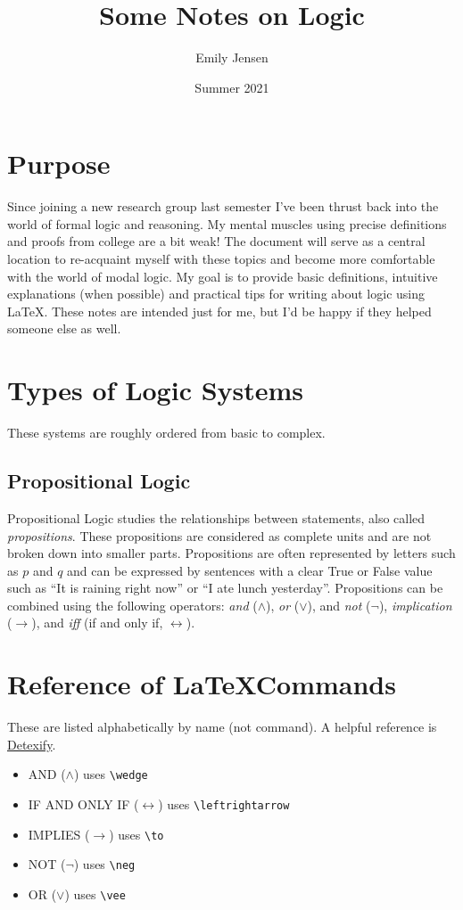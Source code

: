 \documentclass{article}
\title{Some Notes on Logic}
\author{Emily Jensen}
\date{Summer 2021}
\begin{document}
\maketitle

\section{Purpose}
Since joining a new research group last semester I've been thrust back into the world of formal logic and reasoning. My mental muscles using precise definitions and proofs from college are a bit weak! The document will serve as a central location to re-acquaint myself with these topics and become more comfortable with the world of modal logic. My goal is to provide basic definitions, intuitive explanations (when possible) and practical tips for writing about logic using \LaTeX. These notes are intended just for me, but I'd be happy if they helped someone else as well.

\section{Types of Logic Systems}

These systems are roughly ordered from basic to complex.

\subsection{Propositional Logic}
Propositional Logic studies the relationships between statements, also called \textit{propositions}. These propositions are considered as complete units and are not broken down into smaller parts. Propositions are often represented by letters such as $p$ and $q$ and can be expressed by sentences with a clear True or False value such as ``It is raining right now'' or ``I ate lunch yesterday''. Propositions can be combined using the following operators: \textit{and} ($\wedge$), \textit{or} ($\vee$), and \textit{not} ($\neg$), \textit{implication} ($\to$), and \textit{iff} (if and only if, $\leftrightarrow$).

\section{Reference of \LaTeX Commands}

These are listed alphabetically by name (not command). A helpful reference is \href{http://detexify.kirelabs.org/classify.html}{Detexify}.

\begin{itemize}
    \item AND ($\wedge$) uses \verb|\wedge|
    \item IF AND ONLY IF ($\leftrightarrow$) uses \verb|\leftrightarrow|
    \item IMPLIES ($\to$) uses \verb|\to|
    \item NOT ($\neg$) uses \verb|\neg|
    \item OR ($\vee$) uses \verb|\vee|
\end{itemize}
\end{document}
